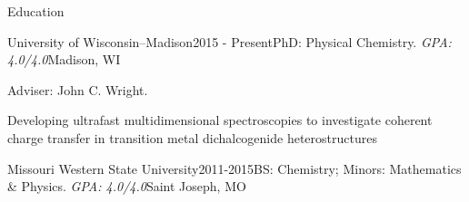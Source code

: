 \documentclass{resume} %
\begin{document}
\begin{rSection}{Education}

\begin{rSubsection}{University of Wisconsin--Madison}{2015 - Present}{PhD: Physical Chemistry. \emph{GPA: 4.0/4.0}}{Madison, WI}
\item Adviser: John C. Wright.
\item Developing ultrafast multidimensional spectroscopies to investigate coherent charge transfer in transition metal dichalcogenide heterostructures
\end{rSubsection}

\begin{rSubsectionlistless}{Missouri Western State University}{2011-2015}{BS: Chemistry; Minors: Mathematics \& Physics. \emph{GPA: 4.0/4.0}}{Saint Joseph, MO} 
\end{rSubsectionlistless}



\end{rSection}
\end{document}
